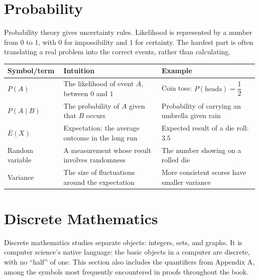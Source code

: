 \section{Probability}

Probability theory gives uncertainty rules. Likelihood is represented by a number from $0$ to $1$, with $0$ for impossibility and $1$ for certainty. The hardest part is often translating a real problem into the correct events, rather than calculating.

\begin{center}
\begin{tabular}{lp{4.8cm}p{5.4cm}}
\toprule
Symbol/term & Intuition & Example \\
\midrule
$P(A)$ & The likelihood of event $A$, between $0$ and $1$ & Coin toss: $P(\text{heads})=\dfrac{1}{2}$ \\
$P(A\mid B)$ & The probability of $A$ given that $B$ occurs & Probability of carrying an umbrella given rain \\
$E(X)$ & Expectation: the average outcome in the long run & Expected result of a die roll: $3.5$ \\
Random variable & A measurement whose result involves randomness & The number showing on a rolled die \\
Variance & The size of fluctuations around the expectation & More consistent scores have smaller variance \\
\bottomrule
\end{tabular}
\end{center}

\section{Discrete Mathematics}

Discrete mathematics studies separate objects: integers, sets, and graphs. It is computer science's native language: the basic objects in a computer are discrete, with no ``half'' of one. This section also includes the quantifiers from Appendix A, among the symbols most frequently encountered in proofs throughout the book.

